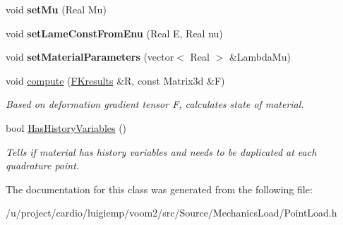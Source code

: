 \begin{DoxyCompactItemize}
\item 
\hypertarget{classvoom_1_1_point_load_a7dd8de114919a5428ed5692b149ee40a}{
void {\bfseries setMu} (Real Mu)}
\label{classvoom_1_1_point_load_a7dd8de114919a5428ed5692b149ee40a}

\item 
\hypertarget{classvoom_1_1_point_load_a85890bff5831fb2db22f6b271b8b4f1b}{
void {\bfseries setLameConstFromEnu} (Real E, Real nu)}
\label{classvoom_1_1_point_load_a85890bff5831fb2db22f6b271b8b4f1b}

\item 
\hypertarget{classvoom_1_1_point_load_a5718133ac6b9516e4050f20bf7352497}{
void {\bfseries setMaterialParameters} (vector$<$ Real $>$ \&LambdaMu)}
\label{classvoom_1_1_point_load_a5718133ac6b9516e4050f20bf7352497}

\item 
\hypertarget{classvoom_1_1_point_load_a0fc8a93dd23d399b06f4f58df3a69fe0}{
void \hyperlink{classvoom_1_1_point_load_a0fc8a93dd23d399b06f4f58df3a69fe0}{compute} (\hyperlink{structvoom_1_1_f_kresults}{FKresults} \&R, const Matrix3d \&F)}
\label{classvoom_1_1_point_load_a0fc8a93dd23d399b06f4f58df3a69fe0}

\begin{DoxyCompactList}\small\item\em Based on deformation gradient tensor F, calculates state of material. \item\end{DoxyCompactList}\item 
\hypertarget{classvoom_1_1_point_load_aec5de28848938c0e6ffcb86aaa9c6b3b}{
bool \hyperlink{classvoom_1_1_point_load_aec5de28848938c0e6ffcb86aaa9c6b3b}{HasHistoryVariables} ()}
\label{classvoom_1_1_point_load_aec5de28848938c0e6ffcb86aaa9c6b3b}

\begin{DoxyCompactList}\small\item\em Tells if material has history variables and needs to be duplicated at each quadrature point. \item\end{DoxyCompactList}\end{DoxyCompactItemize}


The documentation for this class was generated from the following file:\begin{DoxyCompactItemize}
\item 
/u/project/cardio/luigiemp/voom2/src/Source/MechanicsLoad/PointLoad.h\end{DoxyCompactItemize}
